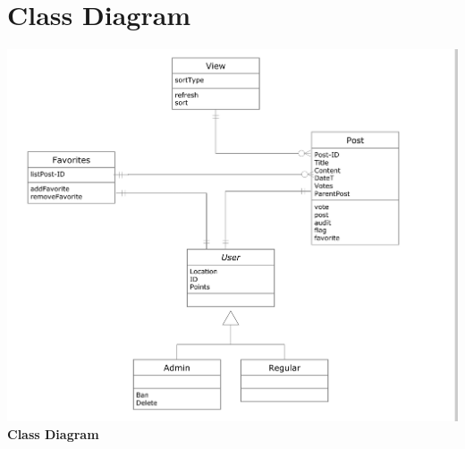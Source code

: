 \documentclass[12pt]{article}
\begin{document}
\section{Class Diagram}
\begin{center}
\includegraphics[scale=0.25]{img/uml/ClassDiagram}\linebreak
\textbf{Class Diagram}
  \end{center}
\end{document}
